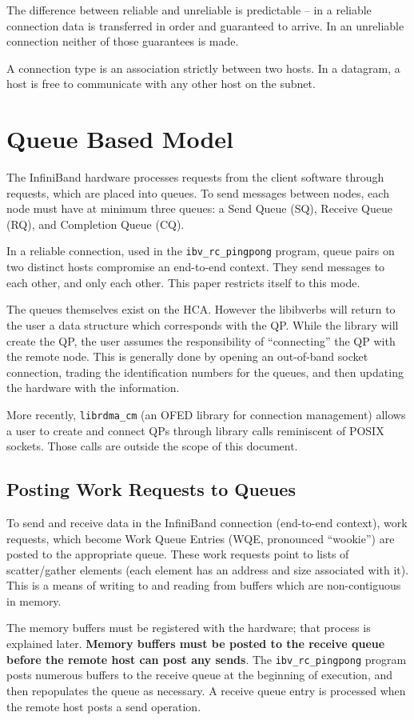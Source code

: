 \documentclass[letterpaper,12pt]{article}
\begin{document}
The difference between reliable and unreliable is predictable -- in a
reliable connection data is transferred in order and guaranteed to arrive.
In an unreliable connection neither of those guarantees is made.

A connection type is an association strictly between two hosts. In a
datagram, a host is free to communicate with any other host on the subnet.

\section{Queue Based Model} The InfiniBand hardware processes requests
from the client software through requests, which are placed into queues.
To send messages between nodes, each node must have at minimum three
queues: a Send Queue (SQ), Receive Queue (RQ), and Completion Queue (CQ).

In a reliable connection, used in the {\tt ibv\_rc\_pingpong} program, queue
pairs on two distinct hosts compromise an end-to-end context. They send
messages to each other, and only each other. This paper restricts itself
to this mode.

The queues themselves exist on the HCA. However the libibverbs will
return to the user a data structure which corresponds with the QP.
While the library will create the QP, the user assumes the
responsibility of ``connecting'' the QP with the remote node. This is
generally done by opening an out-of-band socket connection, trading the
identification numbers for the queues, and then updating the hardware
with the information.

More recently, {\tt librdma\_cm} (an OFED library for connection management) allows
a user to create and connect QPs through library calls reminiscent of
POSIX sockets. Those calls are outside the scope of this document.

\subsection{Posting Work Requests to Queues} To send and receive data
in the InfiniBand connection (end-to-end context), work requests, which
become Work Queue Entries (WQE, pronounced ``wookie'') are posted to the
appropriate queue. These work
requests point to lists of scatter/gather elements (each element has an
address and size associated with it). This is a means of writing to and
reading from buffers which are non-contiguous in memory.

The memory buffers must be registered with the hardware; that process is
explained later.  \textbf{Memory buffers must be posted to the receive
queue before the remote host can post any sends}.  The {\tt ibv\_rc\_pingpong}
program posts numerous buffers to the receive queue at the beginning of
execution, and then repopulates the queue as necessary. A receive queue
entry is processed when the remote host posts a send operation.
\end{document}
